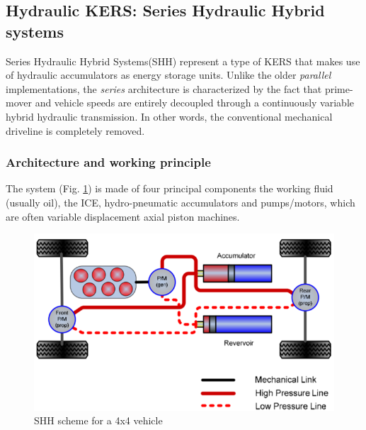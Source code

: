 \documentclass[11pt]{article}
\begin{document}
\subsection{Hydraulic KERS: Series Hydraulic Hybrid systems}

Series Hydraulic Hybrid Systems(SHH) represent a type of KERS that makes use of hydraulic accumulators as energy storage units. Unlike the older \textit{parallel} implementations, the \textit{series} architecture is characterized by the fact that prime-mover and vehicle speeds are entirely decoupled through a continuously variable hybrid hydraulic transmission. In other words, the conventional mechanical driveline is completely removed.

\subsubsection{Architecture and working principle}

The system (Fig. \ref{SHH_scheme}) is made of four principal components \cite{d} the working fluid (usually oil), the ICE, hydro-pneumatic accumulators and pumps/motors, which are often variable displacement axial piston machines.

\begin{figure}[H]
\centering
\includegraphics[width=.6\textwidth]{Images/State_of_the_art/Hydraulic KERS.png}
\caption{SHH scheme for a 4x4 vehicle}
\label{SHH_scheme}
\end{figure}
\end{document}
